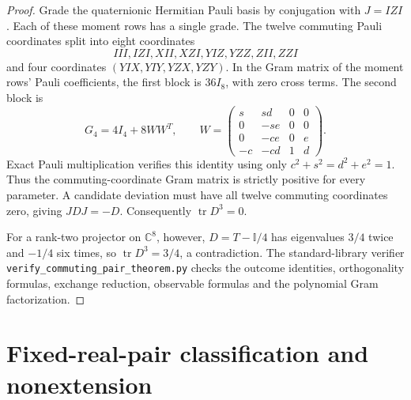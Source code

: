 \documentclass[11pt]{article}
\newcommand{\id}{\mathbb I}
\begin{document}
\begin{proof}
Grade the quaternionic Hermitian Pauli basis by conjugation with
$J=IZI$. Each of these moment rows has a single grade. The twelve
commuting Pauli coordinates split into eight coordinates
\[
 III,IZI,XII,XZI,YIZ,YZZ,ZII,ZZI
\]
and four coordinates $(YIX,YIY,YZX,YZY)$.
In the Gram matrix of the moment rows' Pauli coefficients, the first
block is $36I_8$, with zero cross terms. The second block is
\[
 G_4=4I_4+8WW^T,\qquad
 W=\begin{pmatrix}
 s&sd&0&0\\0&-se&0&0\\0&-ce&0&e\\-c&-cd&1&d
 \end{pmatrix}.
\]
Exact Pauli multiplication verifies this identity using only
$c^2+s^2=d^2+e^2=1$. Thus the commuting-coordinate Gram matrix is
strictly positive for every parameter. A candidate deviation must have
all twelve commuting coordinates zero, giving $JDJ=-D$.
Consequently $\operatorname{tr}D^3=0$.

For a rank-two projector on $\mathbb C^8$, however,
$D=T-\id/4$ has eigenvalues $3/4$ twice and $-1/4$ six times,
so $\operatorname{tr}D^3=3/4$, a contradiction.
The standard-library verifier
\texttt{verify\_commuting\_\allowbreak pair\_theorem.py} checks the outcome identities,
orthogonality formulas, exchange reduction, observable formulas and
the polynomial Gram factorization.
\end{proof}

\section{Fixed-real-pair classification and nonextension}\label{app:fixedpair}
\end{document}
